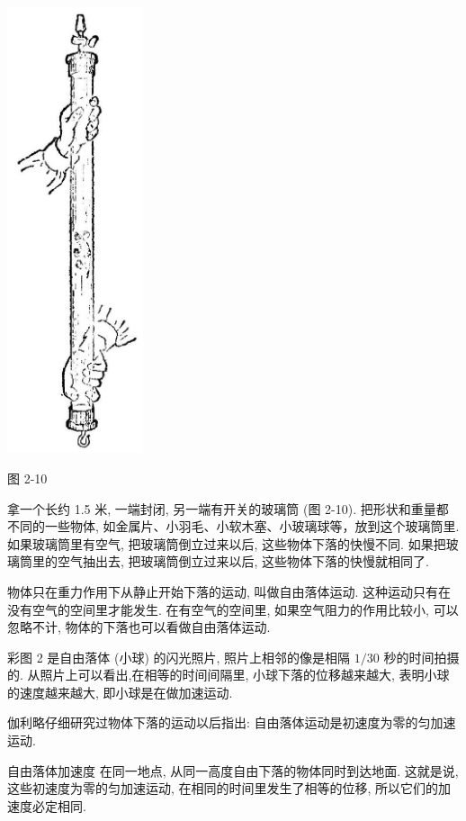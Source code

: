 \documentclass[10pt]{article}
\begin{document}
\begin{center}
\includegraphics[max width=0.3\textwidth]{images/01912d55-147c-70aa-b0e0-1782a122f948_78_579390.jpg}
\end{center}

图 2-10

拿一个长约 1.5 米, 一端封闭, 另一端有开关的玻璃筒 (图 2-10). 把形状和重量都不同的一些物体, 如金属片、小羽毛、小软木塞、小玻璃球等，放到这个玻璃筒里. 如果玻璃筒里有空气, 把玻璃筒倒立过来以后, 这些物体下落的快慢不同. 如果把玻璃筒里的空气抽出去, 把玻璃筒倒立过来以后, 这些物体下落的快慢就相同了.

物体只在重力作用下从静止开始下落的运动, 叫做自由落体运动. 这种运动只有在没有空气的空间里才能发生. 在有空气的空间里, 如果空气阻力的作用比较小, 可以忽略不计, 物体的下落也可以看做自由落体运动.

彩图 2 是自由落体 (小球) 的闪光照片, 照片上相邻的像是相隔 \(1/{30}\) 秒的时间拍摄的. 从照片上可以看出,在相等的时间间隔里, 小球下落的位移越来越大, 表明小球的速度越来越大, 即小球是在做加速运动.

伽利略仔细研究过物体下落的运动以后指出: 自由落体运动是初速度为零的匀加速运动.

自由落体加速度 在同一地点, 从同一高度自由下落的物体同时到达地面. 这就是说, 这些初速度为零的匀加速运动, 在相同的时间里发生了相等的位移, 所以它们的加速度必定相同.
\end{document}
